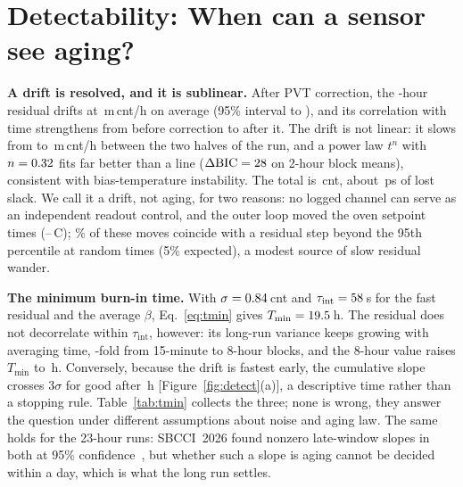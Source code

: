 \documentclass[10pt,twocolumn]{article}
\newcommand{\Tmin}{T_{\min}}
\newcommand{\tint}{\tau_{\mathrm{int}}}
\newcommand{\degC}{\,\textdegree C}
\newcommand{\mcnth}{\,m\,cnt/h}
\begin{document}
\section{Detectability: When can a sensor see aging?}

\textbf{A drift is resolved, and it is sublinear.} After PVT correction, the \vDurRCA-hour residual drifts at \vBetaRCA\mcnth{} on average (95\% interval \vBetaLoRCA{} to \vBetaHiRCA), and its correlation with time strengthens from \vRCAcorrStRaw{} before correction to \vRCAcorrStCorr{} after it. The drift is not linear: it slows from \vRCAfirstHalf{} to \vRCAsecondHalf\mcnth{} between the two halves of the run, and a power law $t^{n}$ with $n=0.32$ fits far better than a line ($\Delta\mathrm{BIC}=28$ on 2-hour block means), consistent with bias-temperature instability. The total is \vRCAdriftCnt\,cnt, about \vRCAdriftPs\,ps of lost slack. We call it a drift, not aging, for two reasons: no logged channel can serve as an independent readout control, and the outer loop moved the oven setpoint \vRCAspChanges{} times (\vRCAspMin--\vRCAspMax\degC); \vSPjumpFrac\% of these moves coincide with a residual step beyond the 95th percentile at random times (5\% expected), a modest source of slow residual wander.

\textbf{The minimum burn-in time.} With $\sigma=0.84$\,cnt and $\tint=\vTauRCA$\,s for the fast residual and the average $\beta$, Eq.~\eqref{eq:tmin} gives $\Tmin=\vTminBound$\,h. The residual does not decorrelate within $\tint$, however: its long-run variance keeps growing with averaging time, \vRCAlrvGrowth-fold from 15-minute to 8-hour blocks, and the 8-hour value raises $\Tmin$ to \vTminLrv\,h. Conversely, because the drift is fastest early, the cumulative slope crosses 3$\sigma$ for good after \vTminSeq\,h [Figure~\ref{fig:detect}(a)], a descriptive time rather than a stopping rule. Table~\ref{tab:tmin} collects the three; none is wrong, they answer the question under different assumptions about noise and aging law. The same holds for the 23-hour runs: SBCCI~2026 found nonzero late-window slopes in both at 95\% confidence~\cite{sbcci26}, but whether such a slope is aging cannot be decided within a day, which is what the long run settles.
\end{document}
